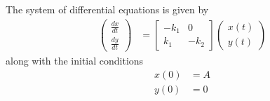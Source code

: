 \documentclass{unswmaths}
\begin{document}
The system of differential equations is given by
\begin{align*}
    \left( \begin{array}{c} \frac{dx}{dt} \\ \frac{dy}{dt} \end{array}\right) &= \left[ \begin{array}{cc} -k_1 & 0 \\ k_1 & -k_2 \end{array} \right] \left( \begin{array}{c} x(t) \\ y(t) \end{array}\right)
\end{align*}
along with the initial conditions
\begin{align*}
    x(0) &= A \\
    y(0) &= 0 
\end{align*}
\end{document}
